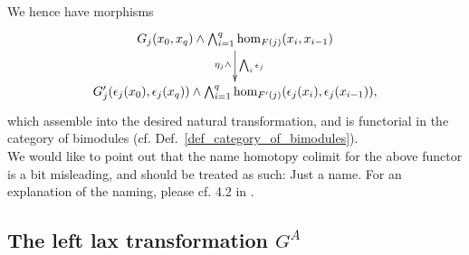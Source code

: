 \begin{defn}
      We hence have morphisms
      \begin{displaymath}
        \xymatrix{
          G_j(x_0,x_q) \wedge \bigwedge_{i=1}^q \hom_{F(j)}(x_i,x_{i-1}) %
            \ar[d]_{\eta_j \wedge}^{\bigwedge_i \epsilon_j}
          \\
          G_j^\prime(\epsilon_j(x_0),\epsilon_j(x_q)) \wedge %
            \bigwedge_{i=1}^q \hom_{F^\prime(j)}(\epsilon_j(x_i),\epsilon_j(x_{i-1})),  
        }
      \end{displaymath}
      which assemble into the desired natural transformation, and is functorial in the category of bimodules (cf. Def.~\ref{def_category_of_bimodules}).\\
      We would like to point out that the name homotopy colimit for the above functor is a bit misleading, and should be treated as such: Just a name. 
      For an explanation of the naming, please cf. 4.2 in \cite{brun2010covering}.
    \end{defn}

  \subsection{The left lax transformation $G^A$}

